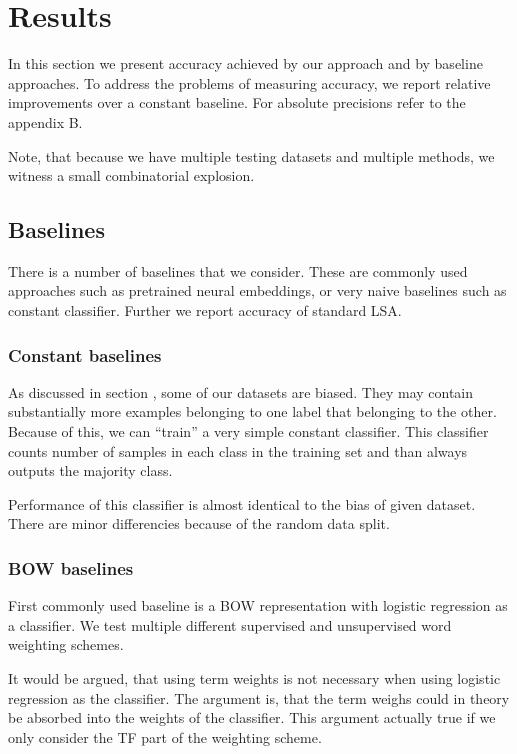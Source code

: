 \section{Results}
    In this section we present accuracy achieved by our approach and by baseline approaches.
    To address the problems of measuring accuracy, we report relative improvements over a constant baseline.
    For absolute precisions refer to the appendix B. 

    Note, that because we have multiple testing datasets and multiple methods, we witness a small combinatorial explosion.

    \subsection{Baselines} \label{sec:baseline}

    There is a number of baselines that we consider.
    These are commonly used approaches such as pretrained neural embeddings, or very naive baselines such as constant classifier.
    Further we report accuracy of standard LSA.

    \subsubsection{Constant baselines}
    As discussed in section \label{sec:data:overview}, some of our datasets are biased. 
    They may contain substantially more examples belonging to one label that belonging to the other.
    Because of this, we can ``train'' a very simple constant classifier. 
    This classifier counts number of samples in each class in the training set and than always outputs the majority class.
    
    Performance of this classifier is almost identical to the bias of given dataset. 
    There are minor differencies because of the random data split. 
    
    \subsubsection{BOW baselines}    
    
    First commonly used baseline is a BOW representation with logistic regression as a classifier. 
    We test multiple different supervised and unsupervised word weighting schemes.
    
    It would be argued, that using term weights is not necessary when using logistic regression as the classifier.
    The argument is, that the term weighs could in theory be absorbed into the weights of the classifier. 
    This argument actually true if we only consider the TF part of the weighting scheme.
    
